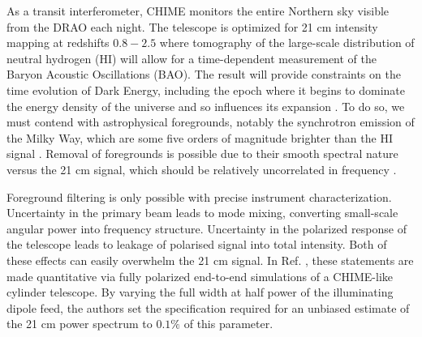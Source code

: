 As a transit interferometer, CHIME monitors the entire Northern sky visible from the DRAO each night. The telescope is optimized for 21 cm intensity mapping at redshifts $0.8-2.5$ where tomography of the large-scale distribution of neutral hydrogen (HI) will allow for a time-dependent measurement of the Baryon Acoustic Oscillations (BAO). The result will provide constraints on the time evolution of Dark Energy, including the epoch where it begins to dominate the energy density of the universe and so influences its expansion \citep{furl, moraleswyithe, bao1}. To do so, we must contend with astrophysical foregrounds, notably the synchrotron emission of the Milky Way, which are some five orders of magnitude brighter than the HI signal \citep{santoscoorayknox}. Removal of foregrounds is possible due to their smooth spectral nature versus the 21 cm signal, which should be relatively uncorrelated in frequency \citep{santoscoorayknox, mmodes1, mmodes2}. 

Foreground filtering is only possible with precise instrument characterization. Uncertainty in the primary beam leads to mode mixing, converting small-scale angular power into frequency structure. Uncertainty in the polarized response of the telescope leads to leakage of polarised signal into total intensity. Both of these effects can easily overwhelm the 21 cm signal. In Ref. \citep{mmodes2}, these statements are made quantitative via fully polarized end-to-end simulations of a CHIME-like cylinder telescope. By varying the full width at half power of the illuminating dipole feed, the authors set the specification required for an unbiased estimate of the 21 cm power spectrum to $0.1\%$ of this parameter.

